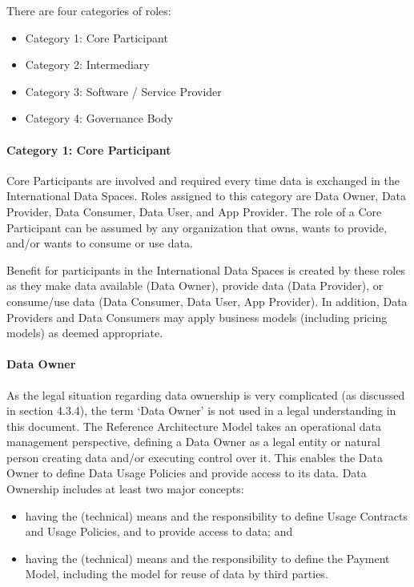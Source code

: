 There are four categories of roles:

\begin{itemize}
	\item Category 1: Core Participant

	\item Category 2: Intermediary

	\item Category 3: Software / Service Provider

	\item Category 4: Governance Body
\end{itemize}\par



\paragraph{Category 1: Core Participant}
Core Participants are involved and required every time data is exchanged in the International Data Spaces. Roles assigned to this category are Data Owner, Data Provider, Data Consumer, Data User, and App Provider. The role of a Core Participant can be assumed by any organization that owns, wants to provide, and/or wants to consume or use data.

Benefit for participants in the International Data Spaces is created by these roles as they make data available (Data Owner), provide data (Data Provider), or consume/use data (Data Consumer, Data User, App Provider). In addition, Data Providers and Data Consumers may apply business models (including pricing models) as deemed appropriate.

\paragraph{Data Owner} %
As the legal situation regarding data ownership is very complicated (as discussed in section 4.3.4), the term ‘Data Owner’ is not used in a legal understanding in this document. The Reference Architecture Model takes an operational data management perspective, defining a Data Owner as a legal entity or natural person creating data and/or executing control over it. This enables the Data Owner to define Data Usage Policies and provide access to its data. Data Ownership includes at least two major concepts:

\begin{itemize}
	\item having the (technical) means and the responsibility to define Usage Contracts and Usage Policies, and to provide access to data; and 

	\item having the (technical) means and the responsibility to define the Payment Model, including the model for reuse of data by third parties. 
\end{itemize}


